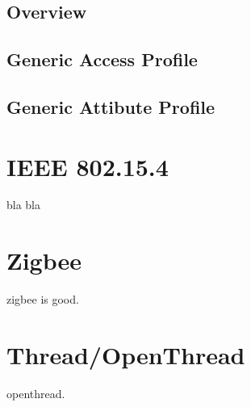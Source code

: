 \subsection{Overview}
\label{ble:ow}

\subsection{Generic Access Profile}
\label{ble:gap}

\subsection{Generic Attibute Profile}
\label{ble:gatt}

\section{IEEE 802.15.4}
\label{sec:15_4}

bla bla

\section{Zigbee}
\label{sec:zig}
zigbee is good.

\section{Thread/OpenThread}
\label{sec:ot}
openthread.
